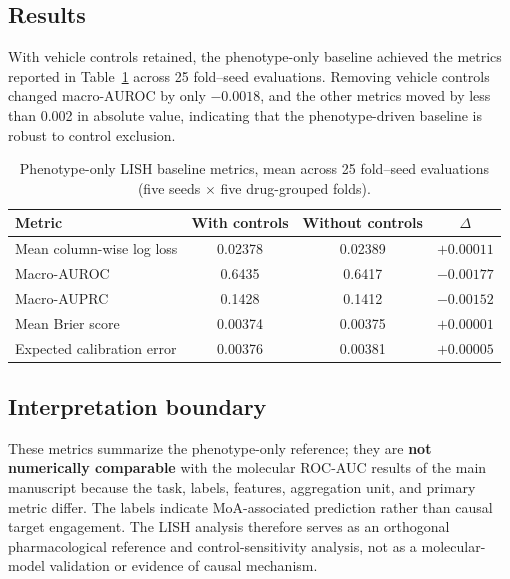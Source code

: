 \documentclass[11pt,a4paper]{article}
\begin{document}
\subsection{Results}

\label{sec:lish_si_results}

With vehicle controls retained, the phenotype-only baseline achieved the metrics reported in Table~\ref{tab:lish_metrics} across \num{25} fold--seed evaluations. Removing vehicle controls changed macro-AUROC by only $-\num{0.0018}$, and the other metrics moved by less than \num{0.002} in absolute value, indicating that the phenotype-driven baseline is robust to control exclusion.

\begin{table}[h]
\centering
\caption{Phenotype-only LISH baseline metrics, mean across \num{25} fold--seed evaluations (five seeds $\times$ five drug-grouped folds).}
\label{tab:lish_metrics}
\begin{tabular}{lccc}
\toprule
Metric & With controls & Without controls & $\Delta$ \\
\midrule
Mean column-wise log loss & \num{0.02378} & \num{0.02389} & $+\num{0.00011}$ \\
Macro-AUROC & \num{0.6435} & \num{0.6417} & $-\num{0.00177}$ \\
Macro-AUPRC & \num{0.1428} & \num{0.1412} & $-\num{0.00152}$ \\
Mean Brier score & \num{0.00374} & \num{0.00375} & $+\num{0.00001}$ \\
Expected calibration error & \num{0.00376} & \num{0.00381} & $+\num{0.00005}$ \\
\bottomrule
\end{tabular}
\end{table}

\subsection{Interpretation boundary}

These metrics summarize the phenotype-only reference; they are \textbf{not numerically comparable} with the molecular ROC-AUC results of the main manuscript because the task, labels, features, aggregation unit, and primary metric differ. The labels indicate MoA-associated prediction rather than causal target engagement. The LISH analysis therefore serves as an orthogonal pharmacological reference and control-sensitivity analysis, not as a molecular-model validation or evidence of causal mechanism.
\end{document}
